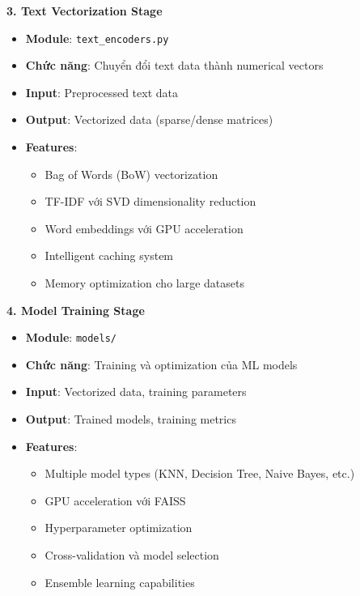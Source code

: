 \textbf{3. Text Vectorization Stage}
\begin{itemize}
    \item \textbf{Module}: \texttt{text\_encoders.py}
    \item \textbf{Chức năng}: Chuyển đổi text data thành numerical vectors
    \item \textbf{Input}: Preprocessed text data
    \item \textbf{Output}: Vectorized data (sparse/dense matrices)
    \item \textbf{Features}:
        \begin{itemize}
            \item Bag of Words (BoW) vectorization
            \item TF-IDF với SVD dimensionality reduction
            \item Word embeddings với GPU acceleration
            \item Intelligent caching system
            \item Memory optimization cho large datasets
        \end{itemize}
\end{itemize}

\textbf{4. Model Training Stage}
\begin{itemize}
    \item \textbf{Module}: \texttt{models/}
    \item \textbf{Chức năng}: Training và optimization của ML models
    \item \textbf{Input}: Vectorized data, training parameters
    \item \textbf{Output}: Trained models, training metrics
    \item \textbf{Features}:
        \begin{itemize}
            \item Multiple model types (KNN, Decision Tree, Naive Bayes, etc.)
            \item GPU acceleration với FAISS
            \item Hyperparameter optimization
            \item Cross-validation và model selection
            \item Ensemble learning capabilities
        \end{itemize}
\end{itemize}

